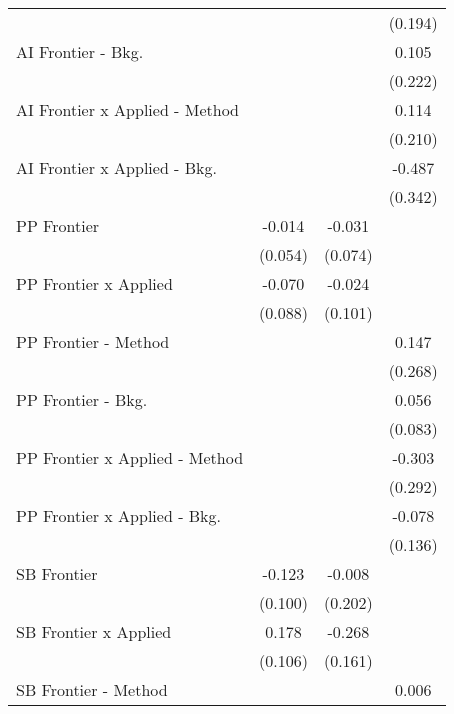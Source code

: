 \begin{tabular}{lccc}
                                  &               &         & (0.194)\\   
   AI Frontier - Bkg.             &               &         & 0.105\\   
                                  &               &         & (0.222)\\   
   AI Frontier x Applied - Method &               &         & 0.114\\   
                                  &               &         & (0.210)\\   
   AI Frontier x Applied - Bkg.   &               &         & -0.487\\   
                                  &               &         & (0.342)\\   
   PP Frontier                    & -0.014        & -0.031  &   \\   
                                  & (0.054)       & (0.074) &   \\   
   PP Frontier x Applied          & -0.070        & -0.024  &   \\   
                                  & (0.088)       & (0.101) &   \\   
   PP Frontier - Method           &               &         & 0.147\\   
                                  &               &         & (0.268)\\   
   PP Frontier - Bkg.             &               &         & 0.056\\   
                                  &               &         & (0.083)\\   
   PP Frontier x Applied - Method &               &         & -0.303\\   
                                  &               &         & (0.292)\\   
   PP Frontier x Applied - Bkg.   &               &         & -0.078\\   
                                  &               &         & (0.136)\\   
   SB Frontier                    & -0.123        & -0.008  &   \\   
                                  & (0.100)       & (0.202) &   \\   
   SB Frontier x Applied          & 0.178         & -0.268  &   \\   
                                  & (0.106)       & (0.161) &   \\   
   SB Frontier - Method           &               &         & 0.006\\   

\end{tabular}
